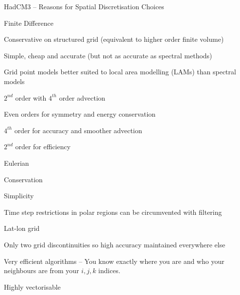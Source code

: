 \begin{slide}{HadCM3 -- Reasons for Spatial Discretisation Choices}

\begin{list1}

\item Finite Difference
\begin{list2}
    \item Conservative on structured grid (equivalent to higher order finite volume)
    \item Simple, cheap and accurate (but not as accurate as spectral methods)
    \item Grid point models better suited to local area modelling (LAMs) than spectral models
\end{list2}

\item $2^{nd}$ order with $4^{th}$ order advection
\begin{list2}
    \item Even orders for symmetry and energy conservation
    \item $4^{th}$ order for accuracy and smoother advection
    \item $2^{nd}$ order for efficiency
\end{list2}

\item Eulerian
\begin{list2}
    \item Conservation
    \item Simplicity
    \item Time step restrictions in polar regions can be circumvented with filtering
\end{list2}

\item Lat-lon grid
\begin{list2}
    \item Only two grid discontinuities so high accuracy maintained everywhere else
    \item Very efficient algorithms -- You know exactly where you are and who your neighbours are from your $i, j, k$ indices.
    \item Highly vectorisable
\end{list2}

\end{list1}
\end{slide}

